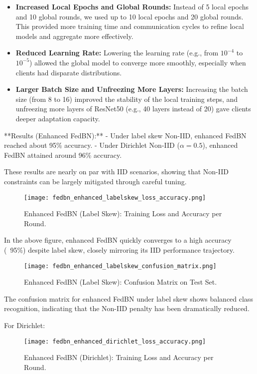 \documentclass[12pt,a4paper]{report}
\begin{document}
\begin{itemize}
	\item \textbf{Increased Local Epochs and Global Rounds:} Instead of 5 local epochs and 10 global rounds, we used up to 10 local epochs and 20 global rounds. This provided more training time and communication cycles to refine local models and aggregate more effectively.
	\item \textbf{Reduced Learning Rate:} Lowering the learning rate (e.g., from $10^{-4}$ to $10^{-5}$) allowed the global model to converge more smoothly, especially when clients had disparate distributions.
	\item \textbf{Larger Batch Size and Unfreezing More Layers:} Increasing the batch size (from 8 to 16) improved the stability of the local training steps, and unfreezing more layers of ResNet50 (e.g., 40 layers instead of 20) gave clients deeper adaptation capacity.
\end{itemize}

**Results (Enhanced FedBN):**
- Under label skew Non-IID, enhanced FedBN reached about 95\% accuracy.
- Under Dirichlet Non-IID ($\alpha=0.5$), enhanced FedBN attained around 96\% accuracy.

These results are nearly on par with IID scenarios, showing that Non-IID constraints can be largely mitigated through careful tuning.

\begin{figure}[H]
	\centering
	\texttt{[image: fedbn\_enhanced\_labelskew\_loss\_accuracy.png]}
	\caption{Enhanced FedBN (Label Skew): Training Loss and Accuracy per Round.}
\end{figure}

In the above figure, enhanced FedBN quickly converges to a high accuracy (~95\%) despite label skew, closely mirroring its IID performance trajectory.

\begin{figure}[H]
	\centering
	\texttt{[image: fedbn\_enhanced\_labelskew\_confusion\_matrix.png]}
	\caption{Enhanced FedBN (Label Skew): Confusion Matrix on Test Set.}
\end{figure}

The confusion matrix for enhanced FedBN under label skew shows balanced class recognition, indicating that the Non-IID penalty has been dramatically reduced.

For Dirichlet:

\begin{figure}[H]
	\centering
	\texttt{[image: fedbn\_enhanced\_dirichlet\_loss\_accuracy.png]}
	\caption{Enhanced FedBN (Dirichlet): Training Loss and Accuracy per Round.}
\end{figure}
\end{document}
